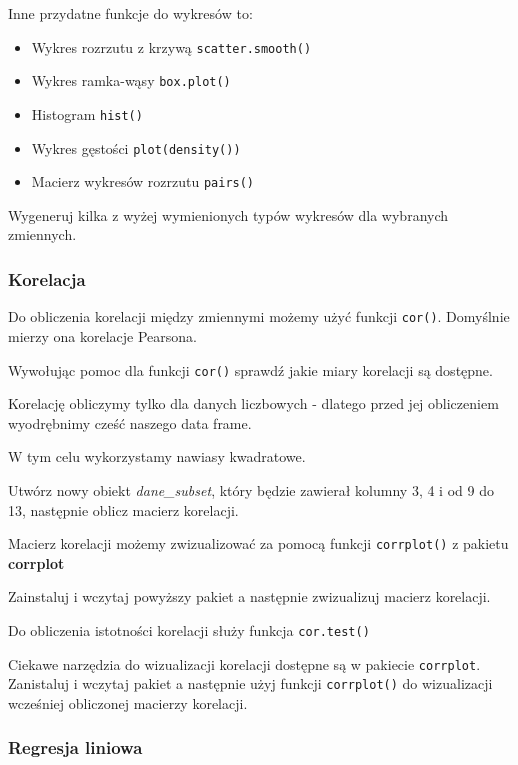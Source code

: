 \documentclass[]{article}
\begin{document}
Inne przydatne funkcje do wykresów to:

\begin{itemize}
\item
  Wykres rozrzutu z krzywą \texttt{scatter.smooth()}
\item
  Wykres ramka-wąsy \texttt{box.plot()}
\item
  Histogram \texttt{hist()}
\item
  Wykres gęstości \texttt{plot(density())}
\item
  Macierz wykresów rozrzutu \texttt{pairs()}
\end{itemize}

Wygeneruj kilka z wyżej wymienionych typów wykresów dla wybranych
zmiennych.

\subsubsection{Korelacja}\label{korelacja}

Do obliczenia korelacji między zmiennymi możemy użyć funkcji
\texttt{cor()}. Domyślnie mierzy ona korelacje Pearsona.

Wywołując pomoc dla funkcji \texttt{cor()} sprawdź jakie miary korelacji
są dostępne.

Korelację obliczymy tylko dla danych liczbowych - dlatego przed jej
obliczeniem wyodrębnimy cześć naszego data frame.

W tym celu wykorzystamy nawiasy kwadratowe.

Utwórz nowy obiekt \emph{dane\_subset}, który będzie zawierał kolumny 3,
4 i od 9 do 13, następnie oblicz macierz korelacji.

Macierz korelacji możemy zwizualizować za pomocą funkcji
\texttt{corrplot()} z pakietu \textbf{corrplot}

Zainstaluj i wczytaj powyższy pakiet a następnie zwizualizuj macierz
korelacji.

Do obliczenia istotności korelacji służy funkcja \texttt{cor.test()}

Ciekawe narzędzia do wizualizacji korelacji dostępne są w pakiecie
\texttt{corrplot}. Zanistaluj i wczytaj pakiet a następnie użyj funkcji
\texttt{corrplot()} do wizualizacji wcześniej obliczonej macierzy
korelacji.

\subsubsection{Regresja liniowa}\label{regresja-liniowa}
\end{document}
